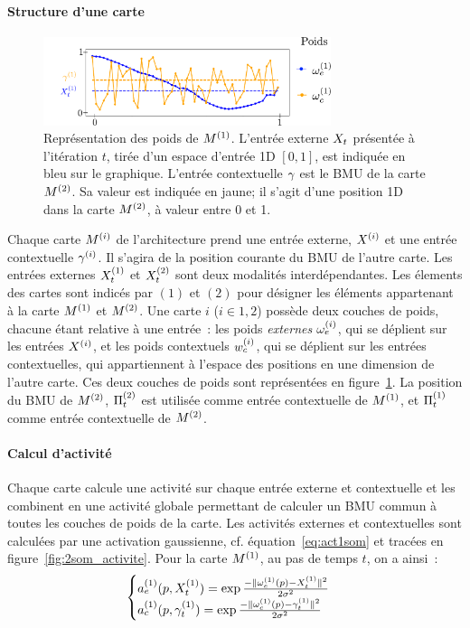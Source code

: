 \documentclass[../main]{subfiles}
\begin{document}
\paragraph{Structure d'une carte}
\begin{figure}
    \centering
    \includegraphics[width=0.75\textwidth]{weights_2som.pdf}
    \caption{Représentation des poids de $M^{({1})}$. L'entrée externe $X_t$ présentée à l'itération $t$, tirée d'un espace d'entrée 1D $[0,1]$, est indiquée en bleu sur le graphique. L'entrée contextuelle $\gamma$ est le BMU de la carte $M^{({2})}$. Sa valeur est indiquée en jaune; il s'agit d'une position 1D dans la carte $M^{({2})}$, à valeur entre 0 et 1. \label{fig:2som_weights}}
    \end{figure}
Chaque carte $M^{({i})}$ de l'architecture prend une entrée externe, $X^{({i})}$ et une entrée contextuelle $\gamma^{({i})}$. Il s'agira de la position courante du BMU de l'autre carte.
Les entrées externes $X^{({1})}_t$ et $X^{({2})}_t$ sont deux modalités interdépendantes.
Les élements des cartes sont indicés par $(1)$ et $(2)$ pour désigner les éléments appartenant à la carte $M^{({1})}$ et $M^{({2})}$.
Une carte $i$ ($i \in {1,2}$) possède deux couches de poids, chacune étant relative à une entrée~: les poids \emph{externes} $\omega_e^{({i})}$, qui se déplient sur les entrées $X^{({i})}$, et les poids contextuels $w_c^{({i})}$, qui se déplient sur les entrées contextuelles, qui appartiennent à l'espace des positions en une dimension de l'autre carte. 
Ces deux couches de poids sont représentées en figure~\ref{fig:2som_weights}. La position du BMU de $M^{({2})}$, $\Pi^{({2})}_t$ est utilisée comme entrée contextuelle de $M^{({1})}$, et $\Pi^{({1})}_t$ comme entrée contextuelle de $M^{({2})}$.

\paragraph{Calcul d'activité}

Chaque carte calcule une activité sur chaque entrée externe et contextuelle et les combinent en une activité globale permettant de calculer un BMU commun à toutes les couches de poids de la carte.
Les activités externes et contextuelles sont calculées par une activation gaussienne, cf. équation~\ref{eq:act1som} et tracées en figure~\ref{fig:2som_activite}.
Pour la carte $M^{({1})}$, au pas de temps $t$, on a ainsi~:
\begin{equation}
\label{eq:activite}
\begin{cases}
a_e^{({1})}(p, X_t^{({1})}) = \exp\frac{-\lVert \omega_e^{({1})}(p)-X^{({1})}_t \rVert^2}{2\sigma^2} \\
a_c^{({1})}(p, \gamma^{({1})}_t) = \exp\frac{-\lVert \omega_c^{({1})}(p)-\gamma^{({1})}_t \rVert ^2}{2\sigma^2}\\
\end{cases}
\end{equation}
\end{document}
